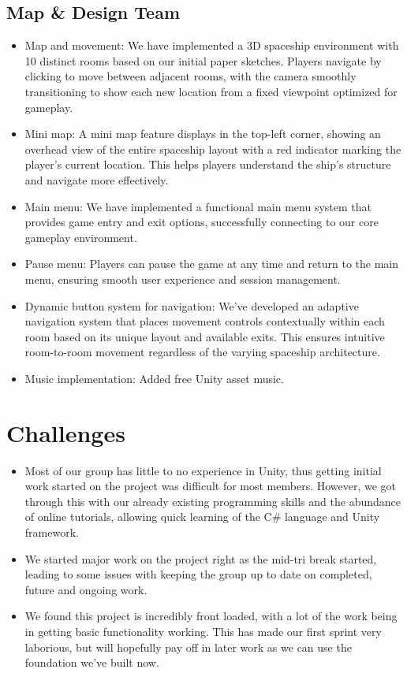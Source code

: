 \documentclass{article}
\begin{document}
\subsection*{Map \& Design Team}
\begin{itemize}
    \item Map and movement: We have implemented a 3D spaceship environment with 10 distinct rooms based on our initial paper sketches. Players navigate by clicking to move between adjacent rooms, with the camera smoothly transitioning to show each new location from a fixed viewpoint optimized for gameplay.
    \item Mini map: A mini map feature displays in the top-left corner, showing an overhead view of the entire spaceship layout with a red indicator marking the player's current location. This helps players understand the ship's structure and navigate more effectively.
    \item Main menu: We have implemented a functional main menu system that provides game entry and exit options, successfully connecting to our core gameplay environment.
    \item Pause menu: Players can pause the game at any time and return to the main menu, ensuring smooth user experience and session management.
    \item Dynamic button system for navigation: We've developed an adaptive navigation system that places movement controls contextually within each room based on its unique layout and available exits. This ensures intuitive room-to-room movement regardless of the varying spaceship architecture.
    \item Music implementation: Added free Unity asset music. 
\end{itemize}


\section{Challenges}
\begin{itemize}
    \item Most of our group has little to no experience in Unity, thus getting initial work started on the project was difficult for most members. However, we got through this with our already existing programming skills and the abundance of online tutorials, allowing quick learning of the C\# language and Unity framework.
    \item We started major work on the project right as the mid-tri break started, leading to some issues with keeping the group up to date on completed, future and ongoing work.
    \item We found this project is incredibly front loaded, with a lot of the work being in getting basic functionality working. This has made our first sprint very laborious, but will hopefully pay off in later work as we can use the foundation we've built now.
\end{itemize}
\end{document}
